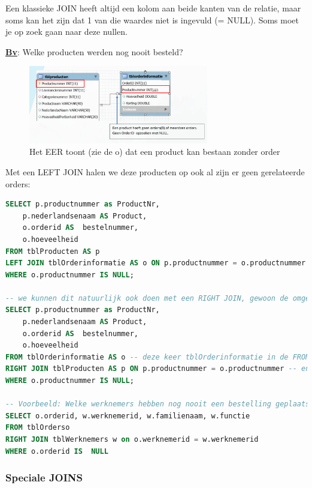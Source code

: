\documentclass{article}
\newcommand{\bold}[1]{\textbf{#1}}
\begin{document}
Een klassieke JOIN heeft altijd een kolom aan beide kanten van de relatie, maar soms kan het zijn dat 1 van die waardes niet is ingevuld (= NULL).
Soms moet je op zoek gaan naar deze nullen.

\underline{\bold{Bv}}: Welke producten werden nog nooit besteld?

\begin{figure}[H]
    \centering
    \includegraphics[width=0.7\textwidth]{Screenshot_20200304_151733.png}
    \caption{Het EER toont (zie de o) dat een product kan bestaan zonder order}
\end{figure}

Met een LEFT JOIN halen we deze producten op ook al zijn er geen gerelateerde orders:

\begin{lstlisting}[language=SQL]
SELECT p.productnummer as ProductNr, 
    p.nederlandsenaam AS Product, 
    o.orderid AS  bestelnummer, 
    o.hoeveelheid
FROM tblProducten AS p 
LEFT JOIN tblOrderinformatie AS o ON p.productnummer = o.productnummer
WHERE o.productnummer IS NULL;

-- we kunnen dit natuurlijk ook doen met een RIGHT JOIN, gewoon de omgekeerde operatie:
SELECT p.productnummer as ProductNr, 
    p.nederlandsenaam AS Product, 
    o.orderid AS  bestelnummer, 
    o.hoeveelheid
FROM tblOrderinformatie AS o -- deze keer tblOrderinformatie in de FROM-clause
RIGHT JOIN tblProducten AS p ON p.productnummer = o.productnummer -- en tblProducten in de JOIN-clause
WHERE o.productnummer IS NULL;

-- Voorbeeld: Welke werknemers hebben nog nooit een bestelling geplaatst? 
SELECT o.orderid, w.werknemerid, w.familienaam, w.functie 
FROM tblOrderso
RIGHT JOIN tblWerknemers w on o.werknemerid = w.werknemerid
WHERE o.orderid IS  NULL
\end{lstlisting}

\subsubsection{Speciale JOINS}
\end{document}
